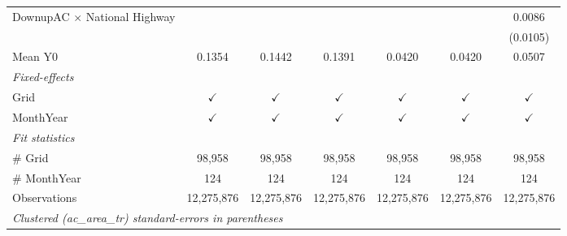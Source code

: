\begin{table}[htbp]
\begin{tabular}{lcccccc}
      DownupAC $\times$ National Highway                         &               &               &               &               &               & 0.0086\\   
                                                                 &               &               &               &               &               & (0.0105)\\   
      \hline Mean Y0                                             & 0.1354        & 0.1442        & 0.1391        & 0.0420        & 0.0420        & 0.0507\\  
      \midrule
      \emph{Fixed-effects}\\
      Grid                                                       & $\checkmark$  & $\checkmark$  & $\checkmark$  & $\checkmark$  & $\checkmark$  & $\checkmark$\\   
      MonthYear                                                  & $\checkmark$  & $\checkmark$  & $\checkmark$  & $\checkmark$  & $\checkmark$  & $\checkmark$\\   
      \midrule
      \emph{Fit statistics}\\
      \# Grid                                                    & 98,958        & 98,958        & 98,958        & 98,958        & 98,958        & 98,958\\  
      \# MonthYear                                               & 124           & 124           & 124           & 124           & 124           & 124\\  
      Observations                                               & 12,275,876    & 12,275,876    & 12,275,876    & 12,275,876    & 12,275,876    & 12,275,876\\  
      \midrule \midrule
      \multicolumn{7}{l}{\emph{Clustered (ac\_area\_tr) standard-errors in parentheses}}\\
   \end{tabular}
\end{table}


